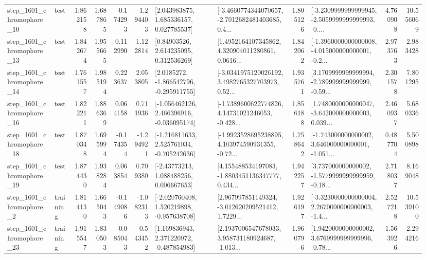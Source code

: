 \begin{tabular}{llrrrrllrlrr}
 step\_1601\_chromophore\_10 &      test &      1.862158 &    1.687865 &     -0.174293 & -1.294403 &     [2.043983875, 1.685336157, 0.027785537] &  [-3.4660774344070657, -2.7012682481403685, 0.4... &       1.805126 &  [-3.2309999999999945, -2.5059999999999993, -0.... &            4.760908 &         10.556069 \\
 step\_1601\_chromophore\_13 &      test &      1.842674 &    1.955665 &      0.112990 &  1.122814 &      [0.84903526, 2.614235095, 0.312536269] &  [1.4952164107345862, 4.320904011280861, 0.0616... &       1.842062 &  [-1.3960000000000008, -4.015000000000001, -0.2... &            2.973763 &          2.983428 \\
 step\_1601\_chromophore\_14 &      test &      1.761557 &    1.985194 &      0.223637 &  2.053805 &     [2.0185272, -1.866542796, -0.295911755] &  [-3.0341975120026192, 3.4982765327703973, 0.52... &       1.935761 &  [3.1709999999999994, -2.789999999999999, -0.59... &            2.301578 &          7.801295 \\
 step\_1601\_chromophore\_16 &      test &      1.822211 &    1.886369 &      0.064158 &  0.711936 &   [-1.056462126, 2.466396916, -0.036095174] &  [-1.7389600622774826, 4.14731021246053, -0.428... &       1.856188 &  [1.7480000000000047, -3.642000000000003, 0.039... &            2.460937 &          5.680336 \\
 step\_1601\_chromophore\_18 &      test &      1.870348 &    1.695994 &     -0.174354 & -1.294921 &   [-1.216811633, 2.525761034, -0.705242636] &  [-1.9923528695238895, 4.103974590931355, -0.72... &       1.758642 &  [-1.743000000000002, 3.646000000000001, -1.051... &            0.487704 &          5.500898 \\
 step\_1601\_chromophore\_19 &      test &      1.874430 &    1.938284 &      0.063854 &  0.709380 &     [-2.43773213, 1.088488256, 0.006667653] &  [4.155488534197083, -1.8803451136347777, 0.434... &       1.942257 &  [3.737000000000002, -1.5779999999999959, -0.18... &            2.718037 &          8.169048 \\
  step\_1601\_chromophore\_2 &  training &      1.814130 &    1.665043 &     -0.149086 & -1.082313 &   [-2.020760408, 1.520219898, -0.957638708] &  [2.967997851149324, -3.012620209521412, 1.7229... &       1.926197 &  [-3.3230000000000004, 2.2670000000000003, -1.4... &            2.527218 &         10.539100 \\
 step\_1601\_chromophore\_23 &  training &      1.915547 &    1.830503 &     -0.085043 & -0.543452 &    [1.169836943, 2.371220972, -0.487854983] &  [2.1937006547678033, 3.958731180924687, -1.013... &       1.960796 &  [1.9420000000000002, 3.6769999999999996, -0.78... &            1.563926 &          2.294216 \\

\end{tabular}
